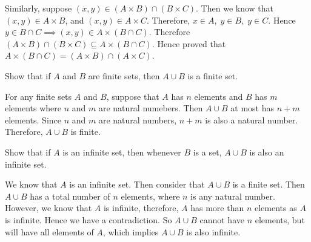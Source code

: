 \documentclass[addpoints]{exam}
\newenvironment{problem}[2][Problem]{\begin{trivlist}
\item[\hskip \labelsep {\bfseries #1}\hskip \labelsep {\bfseries #2.}]}{\end{trivlist}}
\begin{document}
\begin{sloppypar}
\begin{questions}
\begin{solution}
\begin{enumerate}[(a)]
                Similarly, suppose $(x, y) \in (A \times B) \cap (B \times C)$. Then we know that $ (x, y) \in A \times B $, and $ (x, y) \in A \times C $. Therefore, $ x \in A, \; y \in B, \; y \in C. $ Hence $ y \in B \cap C \implies (x, y) \in A \times (B \cap C)$. Therefore $ (A \times B) \cap (B \times C) \subseteq A \times (B \cap C) $. Hence proved that $ A \times (B \cap C) = (A \times B) \cap (A \times C) $.
            \end{enumerate}
        \end{solution}
    \end{questions}

    \begin{problem}{13}[Chapter 2.2, Question 44]
     Show that if $A$ and $B$ are finite sets, then $ A \cup B$ is a finite set.
    \end{problem}

    \begin{questions}
        \question
        \begin{solution}
            
            For any finite sets $A$ and $B$, suppose that $ A $ has $n$ elements and $B$ has $m$ elements where $n$ and $m$ are natural numebers. Then $ A \cup B $ at most has $n + m$ elements. Since $n$ and $m$ are natural numbers, $n + m$ is also a natural number. Therefore, $ A \cup B $ is finite.
        \end{solution}
    \end{questions}

    \begin{problem}{14}[Chapter 2.2, Question 45]
        Show that if $A$ is an infinite set, then whenever $B$ is a set, $ A \cup B$ is also an  infinite set.
    \end{problem}

    \begin{questions}
        \question
        \begin{solution}
            
            We know that $A$ is an infinite set. Then consider that $ A \cup B $ is a finite set. Then $ A \cup B $ has a total number of $n$ elements, where $n$ is any natural number. However, we know that $A$ is infinite, therefore, $A$ has more than $n$ elements as $A$ is infinite. Hence we have a contradiction. So $ A \cup B $ cannot have $n$ elements, but will have all elements of $A$, which implies $ A \cup B $ is also infinite.
        \end{solution}
    \end{questions}

\end{sloppypar}
\end{document}

